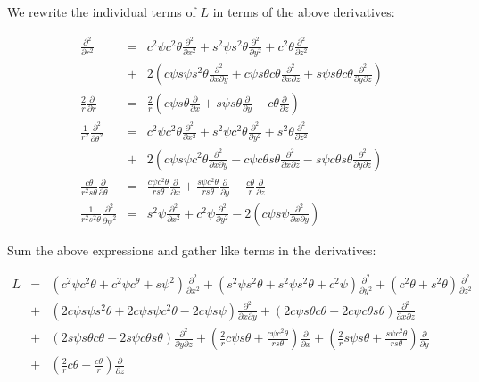 \documentclass[a4paper,12pt]{article}
\begin{document}
We rewrite the individual terms of $L$ in terms of the above derivatives:

\begin{eqnarray}
\frac{\partial^2}{\partial r^2} &=& c^2\psi c^2\theta \frac{\partial^2}{\partial x^2} + s^2\psi s^2\theta\frac{\partial^2}{\partial y^2} + c^2\theta\frac{\partial^2}{\partial z^2} \nonumber\\&+& 2\left( c\psi s\psi s^2\theta \frac{\partial^2}{\partial x \partial y} +  c\psi s\theta c\theta \frac{\partial^2}{\partial x \partial z} + s\psi s\theta c\theta \frac{\partial^2}{\partial y \partial z}\right)\nonumber\\
\frac{2}{r}\frac{\partial}{\partial r} &=& \frac{2}{r}\left(c\psi s\theta \frac{\partial}{\partial x} + s\psi s\theta\frac{\partial}{\partial y} + c\theta\frac{\partial}{\partial z}\right)\nonumber\\
\frac{1}{r^2}\frac{\partial^2}{\partial \theta^2} &=& c^2\psi c^2\theta \frac{\partial^2}{\partial x^2} + s^2\psi c^2\theta \frac{\partial^2}{\partial y^2} + s^2\theta\frac{\partial^2}{\partial z^2}\nonumber\\ &+& 2\left(c\psi s\psi c^2\theta \frac{\partial^2}{\partial x \partial y} - c\psi c\theta s\theta \frac{\partial^2}{\partial x \partial z} - s\psi c\theta s\theta \frac{\partial^2}{\partial y \partial z}\right)\nonumber\\
\frac{c\theta}{r^2 s\theta}\frac{\partial}{\partial \theta} &=& \frac{c\psi c^2\theta}{rs\theta} \frac{\partial}{\partial x} + \frac{s\psi c^2\theta}{r s\theta}\frac{\partial}{\partial y} - \frac{c\theta}{r}\frac{\partial}{\partial z}\nonumber\\
\frac{1}{r^2 s^2\theta}\frac{\partial^2}{\partial \psi^2} &=& s^2\psi \frac{\partial^2}{\partial x^2} + c^2\psi\frac{\partial^2}{\partial y^2} - 2\left(c\psi s\psi \frac{\partial^2}{\partial x \partial y}\right)\nonumber
\end{eqnarray}

Sum the above expressions and gather like terms in the derivatives:

\begin{eqnarray}
L &=& \left(c^2\psi c^2\theta + c^2\psi c^\theta + s\psi^2\right)\frac{\partial^2}{\partial x^2} + \left(s^2\psi s^2\theta + s^2\psi s^2\theta + c^2 \psi\right)\frac{\partial^2}{\partial y^2} + \left(c^2\theta + s^2\theta\right)\frac{\partial^2}{\partial z^2}\nonumber\\ &+& \left(2c\psi s\psi s^2\theta + 2c\psi s\psi c^2\theta - 2c\psi s\psi\right)\frac{\partial^2}{\partial x \partial y} + \left(2c\psi s\theta c\theta - 2c\psi c\theta s\theta \right)\frac{\partial^2}{\partial x \partial z} \nonumber\\&+& \left(2 s\psi s\theta c\theta - 2s\psi c\theta s\theta\right)\frac{\partial^2}{\partial y \partial z} + \left(\frac{2}{r}c\psi s\theta + \frac{c\psi c^2\theta}{r s\theta}\right)\frac{\partial}{\partial x} + \left(\frac{2}{r}s\psi s\theta + \frac{s\psi c^2\theta}{r s\theta}\right)\frac{\partial}{\partial y}\nonumber\\ &+& \left(\frac{2}{r}c\theta - \frac{c\theta}{r}\right)\frac{\partial}{\partial z}\nonumber
\end{eqnarray}
\end{document}

